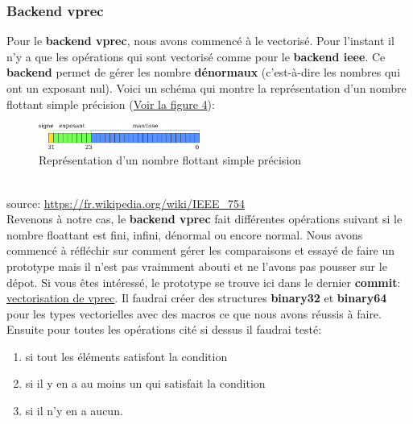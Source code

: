 \documentclass[11pt]{article}
\begin{document}
\subsubsection{Backend vprec}
\label{sec:org9bc18dc}

Pour le \textbf{backend vprec}, nous avons commencé à le vectorisé. Pour l'instant
il n'y a que les opérations qui sont vectorisé comme pour le \textbf{backend ieee}.
\vspace{5mm}
Ce \textbf{backend} permet de gérer les nombre \textbf{dénormaux} (c'est-à-dire les
nombres qui ont un exposant nul).
\vspace{5mm}
Voici un schéma qui montre la représentation d'un nombre flottant simple
précision (\hyperref[fig:orgb3c7269]{Voir la figure 4}):
\vspace{5mm}
\begin{figure}[htbp]
\centering
\includegraphics[width=200px]{../ressources/IEEE754_simple_precision.png}
\caption{\label{fig:orgb3c7269}Représentation d'un nombre flottant simple précision}
\end{figure}\\
\vspace{5mm}
source: \url{https://fr.wikipedia.org/wiki/IEEE\_754}\\
\vspace{5mm}
Revenons à notre cas, le \textbf{backend vprec} fait différentes opérations suivant
si le nombre floattant est fini, infini, dénormal ou encore normal.
\vspace{5mm}
Nous avons commencé à réfléchir sur comment gérer les comparaisons et essayé
de faire un prototype mais il n'est pas vraimment abouti et ne l'avons pas
pousser sur le dépot.
\vspace{5mm}
Si vous êtes intéressé, le prototype se trouve ici dans le dernier \textbf{commit}:
\href{https://github.com/Safecarlo/verificarlo/tree/vectorize-vprec}{vectorisation de vprec}.
\vspace{5mm}
Il faudrai créer des structures \textbf{binary32} et \textbf{binary64} pour les types
vectorielles avec des macros ce que nous avons réussis à faire.
\vspace{5mm}
Ensuite pour toutes les opérations cité si dessus il faudrai testé:
\begin{enumerate}
\item si tout les éléments satisfont la condition
\item si il y en a au moins un qui satisfait la condition
\item si il n'y en a aucun.
\end{enumerate}
\end{document}

